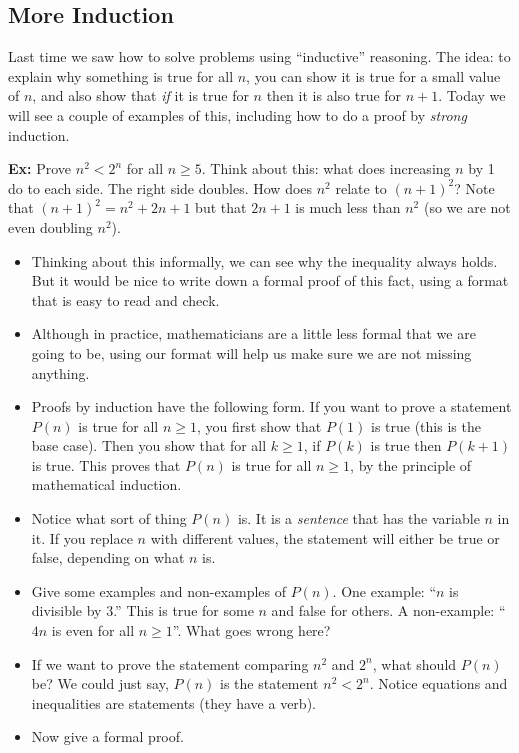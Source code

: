 \documentclass[12pt]{article}
\theoremstyle{plain}
\theoremstyle{definition}
\theoremstyle{remark}
\newcommand{\ex}{\noindent\textbf{Ex:} }
\newcommand{\todayis}[1]{\clearpage{\rhead{\footnotesize #1}}}
\begin{document}
\todayis{Wednesday, September 12}

\subsection*{More Induction}

Last time we saw how to solve problems using ``inductive'' reasoning.  The idea: to explain why something is true for all $n$, you can show it is true for a small value of $n$, and also show that \emph{if} it is true for $n$ then it is also true for $n+1$.  Today we will see a couple of examples of this, including how to do a proof by \emph{strong} induction.

\ex Prove $n^2 < 2^n$ for all $n \ge 5$.  Think about this: what does increasing $n$ by 1 do to each side.  The right side doubles.  How does $n^2$ relate to $(n+1)^2$?  Note that $(n+1)^2 = n^2 + 2n + 1$ but that $2n + 1$ is much less than $n^2$ (so we are not even doubling $n^2$).
\begin{itemize}


\item Thinking about this informally, we can see why the inequality always holds.  But it would be nice to write down a formal proof of this fact, using a format that is easy to read and check.

\item Although in practice, mathematicians are a little less formal that we are going to be, using our format will help us make sure we are not missing anything.

\item Proofs by induction have the following form.  If you want to prove a statement $P(n)$ is true for all $n \ge 1$, you first show that $P(1)$ is true (this is the base case).  Then you show that for all $k \ge 1$, if $P(k)$ is true then $P(k+1)$ is true.  This proves that $P(n)$ is true for all $n \ge 1$, by the principle of mathematical induction.

\item Notice what sort of thing $P(n)$ is.  It is a \emph{sentence} that has the variable $n$ in it.  If you replace $n$ with different values, the statement will either be true or false, depending on what $n$ is.

\item Give some examples and non-examples of $P(n)$.  One example: ``$n$ is divisible by $3$.''  This is true for some $n$ and false for others.  A non-example: ``$4n$ is even for all $n \ge 1$''.  What goes wrong here?

\item If we want to prove the statement comparing $n^2$ and $2^n$, what should $P(n)$ be?  We could just say, $P(n)$ is the statement $n^2 < 2^n$.  Notice equations and inequalities are statements (they have a verb).

\item Now give a formal proof.

\end{itemize}
\end{document}
